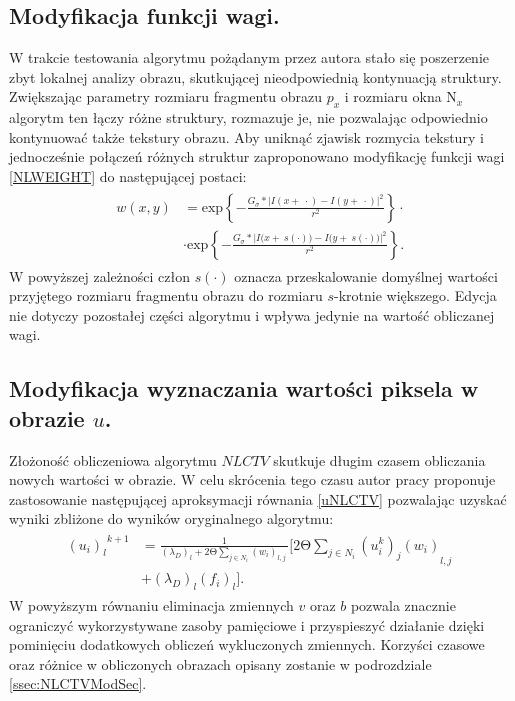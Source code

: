\documentclass[12pt, twoside, openany]{report}
\theoremstyle{definition}
\begin{document}
\subsection{Modyfikacja funkcji wagi.}
W trakcie testowania algorytmu pożądanym przez autora stało się poszerzenie zbyt lokalnej analizy obrazu, skutkującej nieodpowiednią kontynuacją struktury. Zwiększając parametry rozmiaru fragmentu obrazu $p_x$ i rozmiaru okna $\text{N}_x$ algorytm ten łączy różne struktury, rozmazuje je, nie pozwalając odpowiednio kontynuować także tekstury obrazu. Aby uniknąć zjawisk rozmycia tekstury i jednocześnie połączeń różnych struktur zaproponowano modyfikację funkcji wagi \eqref{NLWEIGHT} do następującej postaci:
\begin{align}
\begin{aligned}
w\left(x,y\right) &= {\mathrm{exp} \left\{-\frac{G_{\sigma }*{\big|I\left(x+\ \cdot \right)-I\left(y+\ \cdot \right)\big|}^2}{r^2}\right\} \cdot}\\
&\cdot {\mathrm{exp} \left\{-\frac{G_{\sigma }*{\Big|I\big(x+\ s(\cdot) \big)-I\big(y+\ s(\cdot) \big)\Big|}^2}{r^2}\right\} }.
\label{NLWEIGHTMODIFIED}
\end{aligned}
\end{align}
W powyższej zależności człon $s(\cdot)$ oznacza przeskalowanie  domyślnej wartości przyjętego rozmiaru fragmentu obrazu do rozmiaru $s$-krotnie większego. Edycja nie dotyczy pozostałej części  algorytmu i wpływa jedynie na wartość obliczanej wagi.
\subsection{Modyfikacja wyznaczania wartości piksela w obrazie $u$.}
Złożoność obliczeniowa algorytmu $NLCTV$ skutkuje długim czasem obliczania nowych wartości w obrazie. W celu skrócenia tego czasu autor pracy proponuje zastosowanie następującej aproksymacji równania \eqref{uNLCTV} pozwalając uzyskać wyniki zbliżone do wyników oryginalnego algorytmu:
\begin{align}
\begin{aligned}
{{\left(u_i\right)}_l}^{k+1} &= \frac{1}{{\left({\lambda }_D\right)}_l+2\mathrm{\Theta} \sum\limits_{j\in N_i} {\left(w_i\right)}_{l,j}\ } \Biggl[2\mathrm{\Theta }\sum_{j\in N_i} {{{\left(u^k_i\right)}_j\left(w_i\right)}_{l,j}\ }\\
&+ {\left({\lambda }_D\right)}_l{\left(f_i\right)}_l\Biggr].
\end{aligned}
\label{NLH1}
\end{align}
W powyższym równaniu eliminacja zmiennych $v$ oraz $b$ pozwala znacznie ograniczyć wykorzystywane zasoby pamięciowe i przyspieszyć działanie dzięki pominięciu dodatkowych obliczeń wykluczonych zmiennych. Korzyści czasowe oraz różnice w obliczonych obrazach opisany zostanie w podrozdziale \ref{ssec:NLCTVModSec}.
\end{document}
